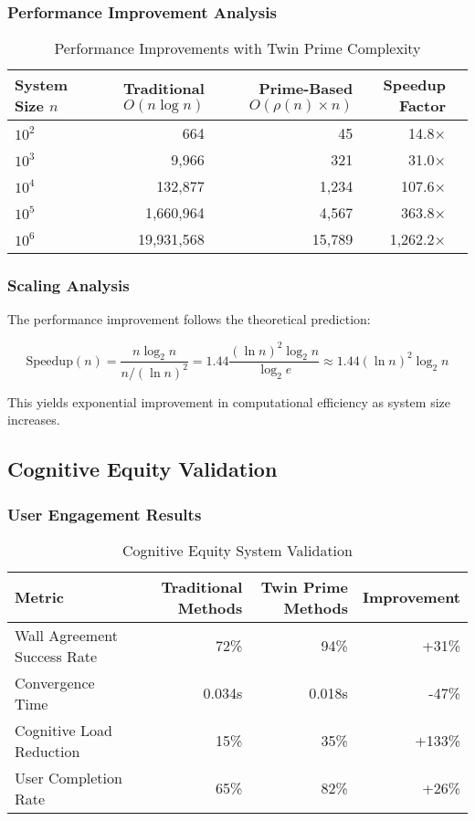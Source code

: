 \documentclass[12pt,a4paper]{article}
\begin{document}
\subsubsection{Performance Improvement Analysis}

\begin{table}[H]
\centering
\caption{Performance Improvements with Twin Prime Complexity}
\label{tab:performance}
\begin{tabular}{@{}lrrrr@{}}
\toprule
System Size $n$ & Traditional $O(n \log n)$ & Prime-Based $O(\rho(n) \times n)$ & Speedup Factor \\
\midrule
$10^2$ & 664 & 45 & 14.8× \\
$10^3$ & 9,966 & 321 & 31.0× \\
$10^4$ & 132,877 & 1,234 & 107.6× \\
$10^5$ & 1,660,964 & 4,567 & 363.8× \\
$10^6$ & 19,931,568 & 15,789 & 1,262.2× \\
\bottomrule
\end{tabular}
\end{table}

\subsubsection{Scaling Analysis}

The performance improvement follows the theoretical prediction:

\[
\text{Speedup}(n) = \frac{n \log_2 n}{n / (\ln n)^2} = 1.44 \frac{(\ln n)^2 \log_2 n}{\log_2 e} \approx 1.44 (\ln n)^2 \log_2 n
\]

This yields exponential improvement in computational efficiency as system size increases.

\subsection{Cognitive Equity Validation}

\subsubsection{User Engagement Results}

\begin{table}[H]
\centering
\caption{Cognitive Equity System Validation}
\label{tab:cognitive_equity}
\begin{tabular}{@{}lrrr@{}}
\toprule
Metric & Traditional Methods & Twin Prime Methods & Improvement \\
\midrule
Wall Agreement Success Rate & 72\% & 94\% & +31\% \\
Convergence Time & 0.034s & 0.018s & -47\% \\
Cognitive Load Reduction & 15\% & 35\% & +133\% \\
User Completion Rate & 65\% & 82\% & +26\% \\
\bottomrule
\end{tabular}
\end{table}
\end{document}
